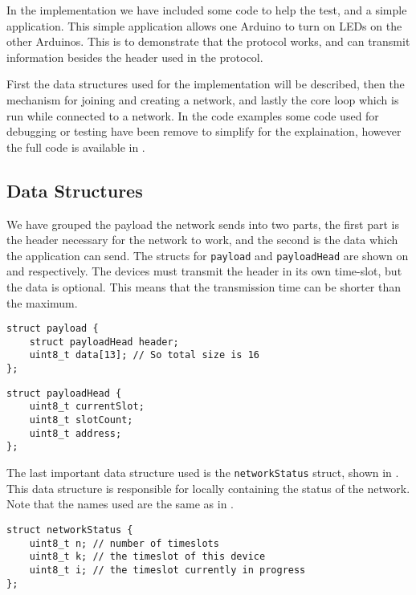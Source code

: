 In the implementation we have included some code to help the test, and a simple application. 
This simple application allows one Arduino to turn on LEDs on the other Arduinos. 
This is to demonstrate that the protocol works, and can transmit information besides the header used in the protocol. 

First the data structures used for the implementation will be described, then the mechanism for joining and creating a network, and lastly the core loop which is run while connected to a network.
In the code examples some code used for debugging or testing have been remove to simplify for the explaination, however the full code is available in \myref{}. 
\subsection{Data Structures}
We have grouped the payload the network sends into two parts, the first part is the header necessary for the network to work, and the second is the data which the application can send.
The structs for \texttt{payload} and \texttt{payloadHead} are shown on  and  respectively.
The devices must transmit the header in its own time-slot, but the data is optional.
This means that the transmission time can be shorter than the maximum. 

\begin{lstlisting}[style=customc,caption={The payload the network uses.},label={lst:ccrc:payload}]
struct payload {
    struct payloadHead header;
    uint8_t data[13]; // So total size is 16
};
\end{lstlisting}

\begin{lstlisting}[style=customc,caption={The header of the payload which the network uses.},label={lst:ccrc:payloadHead}]
struct payloadHead {
    uint8_t currentSlot;
    uint8_t slotCount;
    uint8_t address;
};
\end{lstlisting}

The last important data structure used is the \texttt{networkStatus} struct, shown in .
This data structure is responsible for locally containing the status of the network. 
Note that the names used are the same as in .

\begin{lstlisting}[style=customc,caption={The \texttt{networkStatus} struct, containing the status of the network locally.},label={lst:ccrc:networkStatus}]
struct networkStatus {
    uint8_t n; // number of timeslots
    uint8_t k; // the timeslot of this device
    uint8_t i; // the timeslot currently in progress
};
\end{lstlisting}

